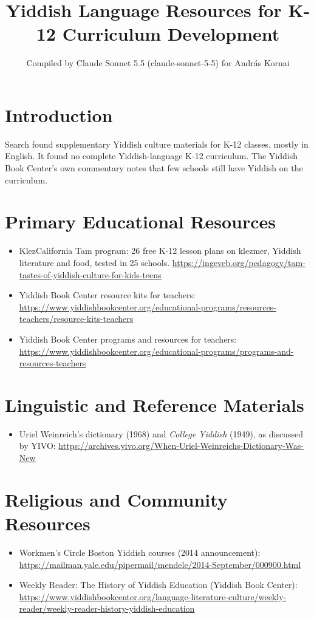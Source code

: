 \documentclass[12pt]{article}
\title{Yiddish Language Resources for K-12 Curriculum Development}
\author{Compiled by Claude Sonnet 5.5 (claude-sonnet-5-5) for Andr\'as Kornai}
\date{}
\begin{document}
\maketitle

\section{Introduction}
Search found supplementary Yiddish culture materials for K-12 classes, mostly in English. It found no complete Yiddish-language K-12 curriculum. The Yiddish Book Center's own commentary notes that few schools still have Yiddish on the curriculum.

\section{Primary Educational Resources}
\begin{itemize}
\item KlezCalifornia Tam program: 26 free K-12 lesson plans on klezmer, Yiddish literature and food, tested in 25 schools. \url{https://ingeveb.org/pedagogy/tam-tastes-of-yiddish-culture-for-kids-teens}
\item Yiddish Book Center resource kits for teachers: \url{https://www.yiddishbookcenter.org/educational-programs/resources-teachers/resource-kits-teachers}
\item Yiddish Book Center programs and resources for teachers: \url{https://www.yiddishbookcenter.org/educational-programs/programs-and-resources-teachers}
\end{itemize}

\section{Linguistic and Reference Materials}
\begin{itemize}
\item Uriel Weinreich's dictionary (1968) and \emph{College Yiddish} (1949), as discussed by YIVO: \url{https://archives.yivo.org/When-Uriel-Weinreichs-Dictionary-Was-New}
\end{itemize}

\section{Religious and Community Resources}
\begin{itemize}
\item Workmen's Circle Boston Yiddish courses (2014 announcement): \url{https://mailman.yale.edu/pipermail/mendele/2014-September/000900.html}
\item Weekly Reader: The History of Yiddish Education (Yiddish Book Center): \url{https://www.yiddishbookcenter.org/language-literature-culture/weekly-reader/weekly-reader-history-yiddish-education}
\end{itemize}
\end{document}
